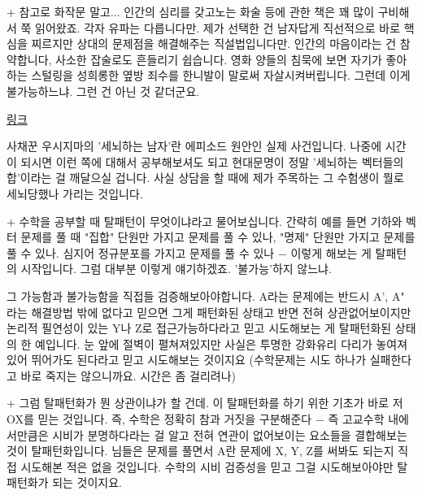 + 참고로 화작문 말고... 인간의 심리를 갖고노는 화술 등에 관한 책은 꽤 많이 구비해서 쭉 읽어왔죠.
각자 유파는 다릅니다만. 제가 선택한 건 남자답게 직선적으로 바로 핵심을 찌르지만 상대의 문제점을 해결해주는 직설법입니다만.
인간의 마음이라는 건 참 약합니다, 사소한 잡술로도 흔들리기 쉽습니다.
영화 양들의 침묵에 보면 자기가 좋아하는 스털링을 성희롱한 옆방 죄수를 한니발이 말로써 자살시켜버립니다.
그런데 이게 불가능하느냐. 그런 건 아닌 것 같더군요.
\vspace{5mm}

\href{https://namu.wiki/w/%ED%82%A4%ED%83%80%ED%81%90%EC%8A%88%20%EA%B0%90%EA%B8%88%20%EC%82%B4%EC%9D%B8%EC%82%AC%EA%B1%B4}{링크}
\vspace{5mm}

사채꾼 우시지마의 '세뇌하는 남자'란 에피소드 원안인 실제 사건입니다.
나중에 시간이 되시면 이런 쪽에 대해서 공부해보셔도 되고
현대문명이 정말 '세뇌하는 벡터들의 합'이라는 걸 깨달으실 겁니다.
사실 상담을 할 때에 제가 주목하는 그 수험생이 뭘로 세뇌당했나 가리는 것입니다.
\vspace{5mm}

+ 수학을 공부할 때 탈패턴이 무엇이냐라고 물어보십니다.
간략히 예를 들면 기하와 벡터 문제를 풀 때 "집합" 단원만 가지고 문제를 풀 수 있나, "명제" 단원만 가지고 문제를 풀 수 있나.
심지어 정규분포를 가지고 문제를 풀 수 있나 $-$ 이렇게 해보는 게 탈패턴의 시작입니다.
그럼 대부분 이렇게 얘기하겠죠. '불가능'하지 않느냐.
\vspace{5mm}

그 가능함과 불가능함을 직접들 검증해보아야합니다.
A라는 문제에는 반드시 A', A" 라는 해결방법 밖에 없다고 믿으면 그게 패턴화된 상태고
반면 전혀 상관없어보이지만 논리적 필연성이 있는 Y나 Z로 접근가능하다라고 믿고 시도해보는 게 탈패턴화된 상태의 한 예입니다.
눈 앞에 절벽이 펼쳐져있지만 사실은 투명한 강화유리 다리가 놓여져 있어 뛰어가도 된다라고 믿고 시도해보는 것이지요
(수학문제는 시도 하나가 실패한다고 바로 죽지는 않으니까요. 시간은 좀 걸리려나)
\vspace{5mm}

+ 그럼 탈패턴화가 뭔 상관이냐가 할 건데. 이 탈패턴화를 하기 위한 기초가 바로 저 OX를 믿는 것입니다.
즉, 수학은 정확히 참과 거짓을 구분해준다 $-$ 즉 고교수학 내에서만큼은 시비가 분명하다라는 걸 알고
전혀 연관이 없어보이는 요소들을 결합해보는 것이 탈패턴화입니다.
님들은 문제를 풀면서 A란 문제에 X, Y, Z를 써봐도 되는지 직접 시도해본 적은 없을 것입니다.
수학의 시비 검증성을 믿고 그걸 시도해보아야만 탈패턴화가 되는 것이지요.
\vspace{5mm}



